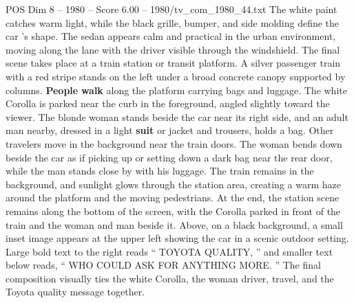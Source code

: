 \begin{textsample}{POS Dim 8 – 1980 – Score 6.00 – 1980/tv\_com\_1980\_44.txt}
The white paint catches warm light, while the black grille, bumper, and side molding define the car ’s shape.
The sedan appears calm and practical in the urban environment, moving along the lane with the driver visible through the windshield.
The final scene takes place at a train station or transit platform.
A silver passenger train with a red stripe stands on the left under a broad concrete canopy supported by columns. \textbf{People} \textbf{walk} along the platform carrying bags and luggage.
The white Corolla is parked near the curb in the foreground, angled slightly toward the viewer.
The blonde woman stands beside the car near its right side, and an adult man nearby, dressed in a light \textbf{suit} or jacket and trousers, holds a bag.
Other travelers move in the background near the train doors.
The woman bends down beside the car as if picking up or setting down a dark bag near the rear door, while the man stands close by with his luggage.
The train remains in the background, and sunlight glows through the station area, creating a warm haze around the platform and the moving pedestrians.
At the end, the station scene remains along the bottom of the screen, with the Corolla parked in front of the train and the woman and man beside it.
Above, on a black background, a small inset image appears at the upper left showing the car in a scenic outdoor setting.
Large bold text to the right reads “ TOYOTA QUALITY, ” and smaller text below reads, “ WHO COULD ASK FOR ANYTHING MORE. ” The final composition visually ties the white Corolla, the woman driver, travel, and the Toyota quality message together.

\end{textsample}
